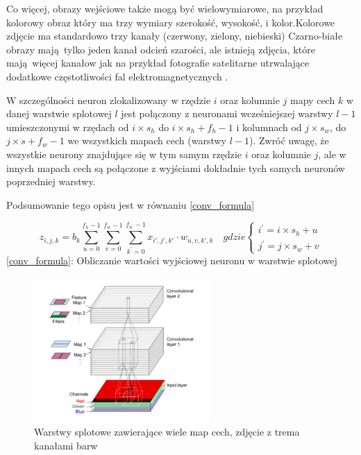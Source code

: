 \documentclass{article}
\begin{document}
Co więcej, obrazy wejściowe także mogą być wielowymiarowe, na przykład kolorowy obraz który ma trzy wymiary szerokość, wysokość, i kolor.Kolorowe zdjęcie ma standardowo trzy kanały (czerwony, zielony, niebieski) Czarno-białe obrazy mają tylko jeden kanał odcień szarości, ale istnieją zdjęcia, które mają więcej kanałow jak na przykład fotografie satelitarne utrwalające dodatkowe częstotliwości fal elektromagnetycznych . \cite{geron}

W szczególności neuron zlokalizowany w rzędzie $i$ oraz kolumnie $j$ mapy cech $k$ w danej warstwie splotowej $l$ jest połączony z neuronami wcześniejszej warstwy $l-1$ umieszczonymi w rzędach od $i \times s_{h}$ do $i \times s_{h}+f_{h}-1$ i kolumnach od $j \times s_{w}$, do $j \times s+f_{w}-1$ we wszystkich mapach cech (warstwy $l-1$). Zwróć uwagę, że wszystkie neurony znajdujące się w tym samym rzędzie $i$ oraz kolumnie $j$, ale w innych mapach cech są połączone z wyjściami dokładnie tych samych neuronów poprzedniej warstwy. \cite{geron}

Podsumowanie tego opisu jest w równaniu \ref{conv_formula}

\begin{center}
	\begin{equation}	
		z_{i,j,k}=b_{k}
		\sum_{u=0}^{f_{h}-1}\sum_{v=0}^{f_{w}-1}\sum_{k^\prime=0}^{f_{n^\prime}-1}
		x_{i\prime,j\prime,k\prime}\cdot w_{u,v,k\prime,k}
		\quad gdzie \left\{ \begin{array}{ll}
			i^\prime = i \times s_{h}+u\\
			j^\prime = j\times s_{w}+v
		\end{array} \right.
		\label{conv_formula}
	\end{equation}
	\ref{conv_formula}: Obliczanie wartości wyjściowej neuronu w warstwie splotowej
\end{center}

\begin{figure}[H]
	\centering
	\includegraphics[width=0.6\textwidth,keepaspectratio=true]{stosy_map_cech}
	\caption{Warstwy splotowe zawierające wiele map cech, zdjęcie z trema kanałami barw \cite{geron}}
	\label{stosy_map_cech}
\end{figure}
\end{document}
